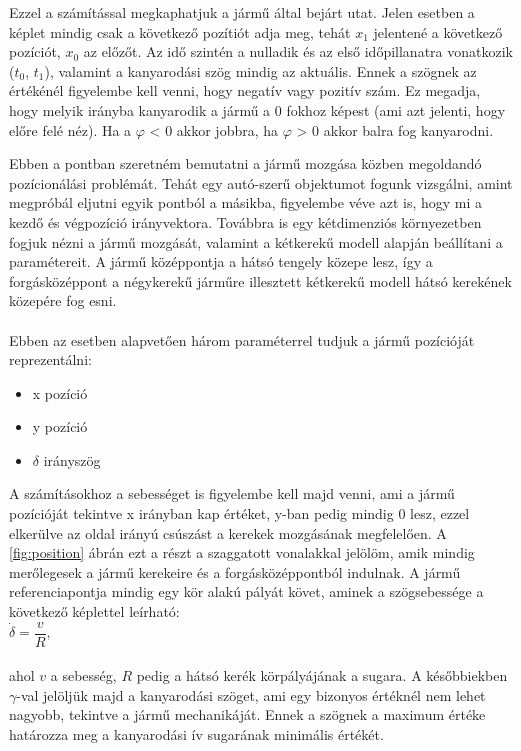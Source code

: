Ezzel a számítással megkaphatjuk a jármű által bejárt utat. Jelen esetben a képlet mindig csak a következő pozítiót adja meg, tehát $x_1$ jelentené a következő pozíciót, $x_0$ az előzőt. Az idő szintén a nulladik és az első időpillanatra vonatkozik ($t_0$, $t_1$), valamint a kanyarodási szög mindig az aktuális. Ennek a szögnek az értékénél figyelembe kell venni, hogy negatív vagy pozitív szám. Ez megadja, hogy melyik irányba kanyarodik a jármű a 0 fokhoz képest (ami azt jelenti, hogy előre felé néz). Ha a $\varphi$ < 0 akkor jobbra, ha $\varphi$ > 0  akkor balra fog kanyarodni.


Ebben a pontban szeretném bemutatni a jármű mozgása közben megoldandó pozícionálási problémát. Tehát egy autó-szerű objektumot fogunk vizsgálni, amint megpróbál eljutni egyik pontból a másikba, figyelembe véve azt is, hogy mi a kezdő és végpozíció irányvektora. Továbbra is egy kétdimenziós környezetben fogjuk nézni a jármű mozgását, valamint a kétkerekű modell alapján beállítani a paramétereit. A jármű középpontja a hátsó tengely közepe lesz, így a forgásközéppont a négykerekű járműre illesztett kétkerekű modell hátsó kerekének közepére fog esni. \\\\
Ebben az esetben alapvetően három paraméterrel tudjuk a jármű pozícióját reprezentálni:
\begin{itemize}
	\item x pozíció
	\item y pozíció
	\item $ \delta $ irányszög
\end{itemize}
A számításokhoz a sebességet is figyelembe kell majd venni, ami a jármű pozícióját tekintve x irányban kap értéket, y-ban pedig mindig 0 lesz, ezzel elkerülve az oldal irányú csúszást a kerekek mozgásának megfelelően. A \ref{fig:position} ábrán ezt a részt a szaggatott vonalakkal jelölöm, amik mindig merőlegesek a jármű kerekeire és a forgásközéppontból indulnak. A jármű referenciapontja mindig egy kör alakú pályát követ, aminek a szögsebessége a következő képlettel leírható:\\

$\dot{\delta} = \dfrac{v}{R},$ \\\\
ahol $ v $ a sebesség, $ R $ pedig a hátsó kerék körpályájának a sugara. A későbbiekben $ \gamma $-val jelöljük majd a kanyarodási szöget, ami egy bizonyos értéknél nem lehet nagyobb, tekintve a jármű mechanikáját. Ennek a szögnek a maximum értéke határozza meg a kanyarodási ív sugarának minimális értékét.

